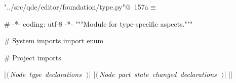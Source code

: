 \documentclass[%
    a4paper,    %
    justified,  %
    nobib,      %
    openany     %
]{tufte-book}
\begin{document}
\begin{flushleft} \small
\begin{minipage}{\linewidth}\label{scrap178}\raggedright\small
{} \verb@"../src/qde/editor/foundation/type.py"@\nobreak\ {\footnotesize {157a}}$\equiv$
\vspace{-1ex}
\begin{pythoncode}
# -*- coding: utf-8 -*-
"""Module for type-specific aspects."""

# System imports
import enum

# Project imports


|\hbox{$\langle\,${\itshape Node type declarations}\nobreak\ {\footnotesize {}}$\,\rangle$}|
|\hbox{$\langle\,${\itshape Node part state changed declarations}\nobreak\ {\footnotesize {}}$\,\rangle$}|
|\NWsep|
\end{pythoncode}
\vspace{1.5ex}
\footnotesize
\begin{list}{}{\setlength{\itemsep}{-\parsep}\setlength{\itemindent}{-\leftmargin}}

\item{}
\end{list}
\end{minipage}\vspace{4ex}
\end{flushleft}
\end{document}
